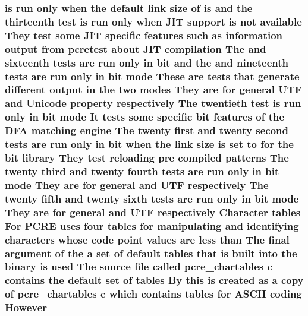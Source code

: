 \subsubsection[{\texorpdfstring{However}{However}}]{ {\bf is} {\bf run} only when the {\bf default} link {\bf size} {\bf of} {\bf is} and the thirteenth test {\bf is} {\bf run} only when J\+IT {\bf support} {\bf is} {\bf not} {\bf available} They test some J\+IT specific {\bf features} such {\bf as} information {\bf output} {\bf from} {\bf pcretest} about J\+IT {\bf compilation} The and sixteenth {\bf tests} {\bf are} {\bf run} only {\bf in} {\bf bit} and the and nineteenth {\bf tests} {\bf are} {\bf run} only {\bf in} {\bf bit} {\bf mode} These {\bf are} {\bf tests} that generate different {\bf output} {\bf in} the two {\bf modes} They {\bf are} for general U\+TF and {\bf Unicode} property {\bf respectively} The twentieth test {\bf is} {\bf run} only {\bf in} {\bf bit} {\bf mode} It {\bf tests} some specific {\bf bit} {\bf features} {\bf of} the D\+FA {\bf matching} engine The twenty {\bf first} and twenty {\bf second} {\bf tests} {\bf are} {\bf run} only {\bf in} {\bf bit} when the link {\bf size} {\bf is} {\bf set} {\bf to} for the {\bf bit} {\bf library} They test reloading pre {\bf compiled} {\bf patterns} The twenty third and twenty fourth {\bf tests} {\bf are} {\bf run} only {\bf in} {\bf bit} {\bf mode} They {\bf are} for general and U\+TF {\bf respectively} The twenty fifth and twenty sixth {\bf tests} {\bf are} {\bf run} only {\bf in} {\bf bit} {\bf mode} They {\bf are} for general and U\+TF {\bf respectively} Character {\bf tables} For {\bf P\+C\+RE} uses four {\bf tables} for manipulating and identifying {\bf characters} whose {\bf code} {\bf point} {\bf values} {\bf are} less {\bf than} The final {\bf argument} {\bf of} the {\bf a} {\bf set} {\bf of} {\bf default} {\bf tables} that {\bf is} {\bf built} into the binary {\bf is} {\bf used} The {\bf source} {\bf file} called pcre\+\_\+chartables {\bf c} {\bf contains} the {\bf default} {\bf set} {\bf of} {\bf tables} By {\bf this} {\bf is} created {\bf as} {\bf a} copy {\bf of} pcre\+\_\+chartables {\bf c} {\bf which} {\bf contains} {\bf tables} for {\bf A\+S\+C\+II} coding However}\hypertarget{README_8txt_accfca29e69f2cdb154f6d7a51394735e}{}\label{README_8txt_accfca29e69f2cdb154f6d7a51394735e}
